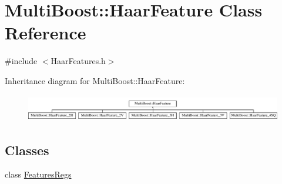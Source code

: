 \hypertarget{classMultiBoost_1_1HaarFeature}{
\section{MultiBoost::HaarFeature Class Reference}
\label{classMultiBoost_1_1HaarFeature}
}


{\ttfamily \#include $<$HaarFeatures.h$>$}

Inheritance diagram for MultiBoost::HaarFeature:\begin{figure}[H]
\begin{center}
\leavevmode
\includegraphics[height=1.191489cm]{classMultiBoost_1_1HaarFeature}
\end{center}
\end{figure}
\subsection*{Classes}
\begin{DoxyCompactItemize}
\item 
class \hyperlink{classMultiBoost_1_1HaarFeature_1_1FeaturesRegs}{FeaturesRegs}
\end{DoxyCompactItemize}
